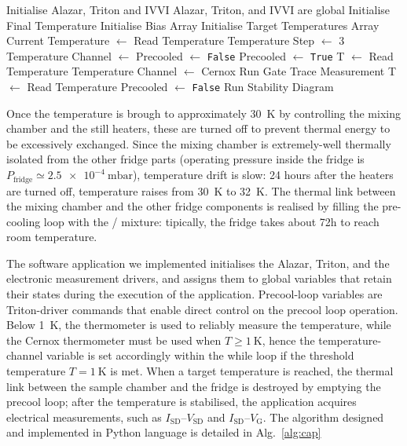 \begin{algorithm}[H]
    \caption{Triton High Temperature Measurement}\label{alg:cap}
    \begin{algorithmic}[1]
        \Require Initialise Alazar, Triton and IVVI
        \Ensure Alazar, Triton, and IVVI are global
        \State Initialise Final Temperature
        \State Initialise Bias Array
        \State Initialise Target Temperatures Array
        \State Current Temperature $\gets$ Read Temperature
        \State Temperature Step $\gets$ 3
        \State Temperature Channel $\gets$ 
        \State Precooled $\gets$ \texttt{False}
        \State Precooled $\gets$ \texttt{True}
        \State T $\gets$ Read Temperature
        \State Temperature Channel $\gets$ Cernox
        \EndIf
        \State Run Gate Trace Measurement
        \EndFor
        \State T $\gets$ Read Temperature
        \State Precooled $\gets$ \texttt{False}
        \State Run Stability Diagram
        \EndIf
        \EndWhile
    \end{algorithmic}
\end{algorithm}

Once the temperature is brough to approximately \SI{30}{\kelvin} by controlling the mixing chamber and the still heaters, these are turned off to prevent thermal energy to be excessively exchanged. Since the mixing chamber is extremely-well thermally isolated from the other fridge parts (operating pressure inside the fridge is $P_\textrm{fridge}\simeq\SI{2.5e-4}{\milli\bar}$), temperature drift is slow: 24 hours after the heaters are turned off, temperature raises from \SI{30}{\kelvin} to \SI{32}{\kelvin}. The thermal link between the mixing chamber and the other fridge components is realised by filling the pre-cooling loop with the / mixture: tipically, the fridge takes about 72h to reach room temperature.

The software application we implemented initialises the Alazar, Triton, and the electronic measurement drivers, and assigns them to global variables that retain their states during the execution of the application. Precool-loop variables are Triton-driver commands that enable direct control on the precool loop operation. Below \SI{1}{\kelvin}, the  thermometer is used to reliably measure the temperature, while the Cernox thermometer must be used when $T\ge\SI{1}{\kelvin}$, hence the temperature-channel variable is set accordingly within the while loop if the threshold temperature $T=\SI{1}{\kelvin}$ is met. When a target temperature is reached, the thermal link between the sample chamber and the fridge is destroyed by emptying the precool loop; after the temperature is stabilised, the application acquires electrical measurements, such as $I_\textrm{SD}$--$V_\textrm{SD}$ and $I_\textrm{SD}$--$V_\textrm{G}$. The algorithm designed and implemented in Python language is detailed in Alg.~\ref{alg:cap}




